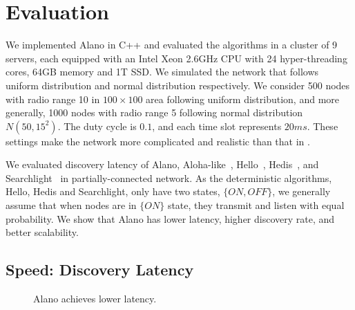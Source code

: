 \section{Evaluation}
\label{Evaluation}


We implemented Alano in C++ and evaluated the algorithms in a cluster of 9 servers, each equipped with an Intel Xeon 2.6GHz CPU with 24 hyper-threading cores, 64GB memory and 1T SSD. 
We simulated the network that follows uniform distribution and normal distribution respectively. We consider 500 nodes with radio range 10 in $100\times100$ area following uniform distribution, and more generally, 1000 nodes with radio range 5 following normal distribution $N(50, 15^2)$. The duty cycle is $0.1$, and each time slot represents $20ms$. 
These settings make the network more complicated and realistic than that in \cite{wang2015blinddate, qiu2016talk, sun2014hello, bakht2012searchlight, chen2015heterogeneous, kandhalu2010u, you2011aloha, mcglynn2001birthday, song2014probabilistic, vasudevan2009neighbor}.



We evaluated discovery latency of Alano, Aloha-like~\cite{you2011aloha}, Hello~\cite{sun2014hello}, Hedis~\cite{chen2015heterogeneous}, and Searchlight~\cite{bakht2012searchlight} in partially-connected network. As the deterministic algorithms, Hello, Hedis and Searchlight, only have two states, $\{ON, OFF\}$, we generally assume that when nodes are in $\{ON\}$ state, they transmit and listen with equal probability.
We show that Alano has lower latency, higher discovery rate, and better scalability.

\subsection{Speed: Discovery Latency}

\begin{figure}[!t]
\centering
{}
\hspace{0.01in}
\caption{Alano achieves lower latency.}
\label{fig_latency}
\end{figure}


